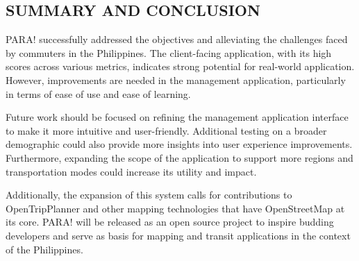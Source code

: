 \documentclass{icsthesis}
\begin{document}
\begin{mainmatter}
		\section{SUMMARY AND CONCLUSION}
		PARA! successfully addressed the objectives and alleviating the challenges faced by commuters in the Philippines. The client-facing application, with its high scores across various metrics, indicates strong potential for real-world application. However, improvements are needed in the management application, particularly in terms of ease of use and ease of learning.

		Future work should be focused on refining the management application interface to make it more intuitive and user-friendly. Additional testing on a broader demographic could also provide more insights into user experience improvements. Furthermore, expanding the scope of the application to support more regions and transportation modes could increase its utility and impact.
		
		Additionally, the expansion of this system calls for contributions to OpenTripPlanner and other mapping technologies that have OpenStreetMap at its core. PARA! will be released as an open source project to inspire budding developers and serve as basis for mapping and transit applications in the context of the Philippines.
		
		

\end{mainmatter}
\end{document}
